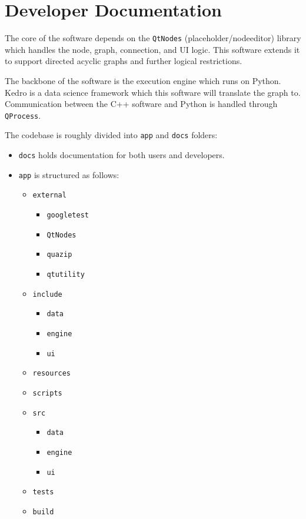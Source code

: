 \section{Developer Documentation}

The core of the software depends on the \texttt{QtNodes} (placeholder/nodeeditor) library which handles the node, graph, connection, and UI logic. This software extends it to support directed acyclic graphs and further logical restrictions.

The backbone of the software is the execution engine which runs on Python. Kedro is a data science framework which this software will translate the graph to. Communication between the C++ software and Python is handled through \texttt{QProcess}.

The codebase is roughly divided into \texttt{app} and \texttt{docs} folders:
\begin{itemize}
    \item \texttt{docs} holds documentation for both users and developers.
    \item \texttt{app} is structured as follows:
    \begin{itemize}
        \item \texttt{external}
        \begin{itemize}
            \item \texttt{googletest}
            \item \texttt{QtNodes}
            \item \texttt{quazip}
            \item \texttt{qtutility}
        \end{itemize}
        \item \texttt{include}
        \begin{itemize}
            \item \texttt{data}
            \item \texttt{engine}
            \item \texttt{ui}
        \end{itemize}
        \item \texttt{resources}
        \item \texttt{scripts}
        \item \texttt{src}
        \begin{itemize}
            \item \texttt{data}
            \item \texttt{engine}
            \item \texttt{ui}
        \end{itemize}
        \item \texttt{tests}
        \item \texttt{build}
    \end{itemize}
\end{itemize}

